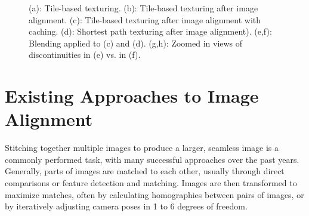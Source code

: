 \documentclass[]{spie}  %
\begin{document}
\begin{figure}[H]
  \centering {}

  \caption{(a): Tile-based texturing. (b): Tile-based texturing after
    image alignment. (c): Tile-based texturing after image alignment
    with caching. (d): Shortest path texturing after image
    alignment). (e,f): Blending applied to (c) and (d). (g,h): Zoomed
    in views of discontinuities in (e) vs. in (f).}
  \label{fig:compareAll}
\end{figure}


\section{Existing Approaches to Image Alignment}
\label{sec:existingApproaches}
Stitching together multiple images to produce a larger, seamless image
is a commonly performed task, with many successful approaches over the
past years. Generally, parts of images are matched to each other,
usually through direct comparisons or feature detection and
matching. Images are then transformed to maximize matches, often by
calculating homographies between pairs of images, or by iteratively
adjusting camera poses in 1 to 6 degrees of freedom.
\end{document}

